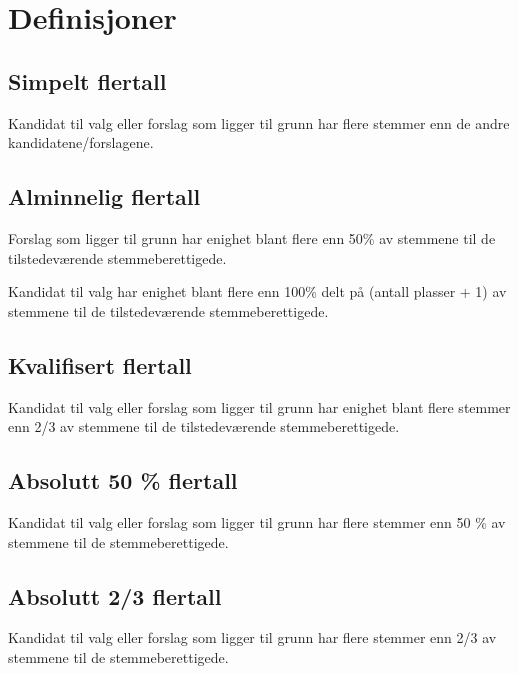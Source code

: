 \section{Definisjoner}
\subsection{Simpelt flertall}
Kandidat til valg eller forslag som ligger til grunn har flere stemmer enn de
andre kandidatene/forslagene.

\subsection{Alminnelig flertall}
Forslag som ligger til grunn har enighet blant flere enn 50\% av stemmene til de
tilstedeværende stemmeberettigede.

Kandidat til valg har enighet blant flere enn 100\% delt på (antall plasser + 1)
av stemmene til de tilstedeværende stemmeberettigede.

\subsection{Kvalifisert flertall}
Kandidat til valg eller forslag som ligger til grunn har enighet blant flere
stemmer enn 2/3 av stemmene til de tilstedeværende stemmeberettigede.

\subsection{Absolutt 50 \% flertall}
Kandidat til valg eller forslag som ligger til grunn har flere stemmer enn 50 \%
av stemmene til de stemmeberettigede.

\subsection{Absolutt 2/3 flertall}
Kandidat til valg eller forslag som ligger til grunn har flere stemmer enn 2/3
av stemmene til de stemmeberettigede.

